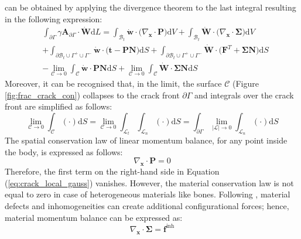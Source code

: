\documentclass[11pt]{ACMEarticle}
\numberwithin{equation}{section}
\begin{document}
can be obtained by applying the divergence theorem to the last integral resulting in the following expression:
\begin{equation}\label{eq:crack_local_gauss}
\begin{aligned}
&  \int_{\partial \Gamma } \gamma \mathbf A_{\partial \Gamma} \cdot \mathbf{\dot W} \mathrm d L = \int_{\mathcal B_t} \mathbf{\dot w} \cdot \big( \nabla_{\mathbf x} \cdot \mathbf P  \big) \mathrm d V + \int_{\mathcal B_t} \mathbf{\dot W} \cdot \big( \nabla_{\mathbf x} \cdot \mathbf \Sigma \big) \mathrm d V \\
& +\int_{\partial \mathcal B_t \cup \Gamma^+ \cup \Gamma^-} \mathbf{\dot w} \cdot \big( \mathbf t - \mathbf{PN}\big) \mathrm  d S + \int_{\partial \mathcal B_t \cup \Gamma^+ \cup \Gamma^-}  \mathbf{\dot W} \cdot \big( \mathbf F^T + \mathbf{\Sigma N} \big) \mathrm d S \\
& - \lim_{\mathcal C \to 0} \int_{\mathcal C} \mathbf{\dot w} \cdot \mathbf {PN} \mathrm d S + \lim_{\mathcal C \to 0} \int_{\mathcal C} \mathbf {\dot W} \cdot \mathbf{\Sigma N} \mathrm d S
\end{aligned}
\end{equation}
Moreover, it can be recognised that, in the limit, the surface $\mathcal C$ (Figure \ref{fig:frac_crack_con}) collapses to the crack front $\partial \Gamma $ and integrals over the crack front are simplified as follows:
\begin{equation}
\lim_{\mathcal C \to 0} \int_{\mathcal C} (\cdot ) \mathrm d S = \lim_{\mathcal C \to 0} \int_{\mathcal L_t} \int_{\mathcal L_n} (\cdot) \mathrm d S = \int_{\partial \Gamma} \lim_{|\mathcal{ L }|\to 0} \int_{\mathcal L_n } (\cdot ) \mathrm d S
\end{equation}
The spatial conservation law of linear momentum balance, for any point inside the body, is expressed as follows:
\begin{equation}
\nabla_{\mathbf x} \cdot \mathbf P = 0
\end{equation}
Therefore, the first term on the right-hand side in Equation (\ref{eq:crack_local_gauss}) vanishes. 
However, the material conservation law is not equal to zero in case of heterogeneous materials like bones. Following \citep{kienzler2014configurational}, material defects and inhomogeneities can create additional configurational forces; hence, material momentum balance can be expressed as:
\begin{equation}
\nabla_{\mathbf x } \cdot \mathbf \Sigma = \mathbf f^{\mathrm {inh}}
\end{equation}
\end{document}

